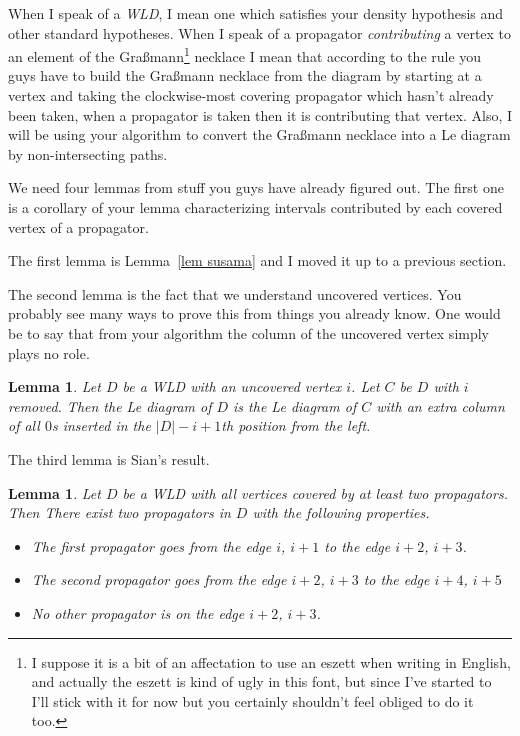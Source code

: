 \documentclass[11pt]{article}
\newtheorem{lem}[thm]{Lemma}
\theoremstyle{remark}
\theoremstyle{definition}
\begin{document}
When I speak of a \emph{WLD}, I mean one which satisfies your density hypothesis and other standard hypotheses.  When I speak of a propagator \emph{contributing} a vertex to an element of the Gra\ss mann\footnote{I suppose it is a bit of an affectation to use an eszett when writing in English, and actually the eszett is kind of ugly in this font, but since I've started to I'll stick with it for now but you certainly shouldn't feel obliged to do it too.} necklace I mean that according to the rule you guys have to build the Gra\ss mann necklace from the diagram by starting at a vertex and taking the clockwise-most covering propagator which hasn't already been taken, when a propagator is taken then it is contributing that vertex.  Also, I will be using your algorithm to convert the Gra\ss mann necklace into a Le diagram by non-intersecting paths.


We need four lemmas from stuff you guys have already figured out.  The first one is a corollary of your lemma characterizing intervals contributed by each covered vertex of a propagator.

The first lemma is Lemma~\ref{lem susama} and I moved it up to a previous section.

The second lemma is the fact that we understand uncovered vertices.  You probably see many ways to prove this from things you already know.  One would be to say that from your algorithm the column of the uncovered vertex simply plays no role.

\begin{lem}\label{lem uncovered}
  Let $D$ be a WLD with an uncovered vertex $i$.  Let $C$ be $D$ with $i$ removed.  Then the Le diagram of $D$ is the Le diagram of $C$ with an extra column of all $0$s inserted in the $|D|-i+1$th position from the left.
\end{lem}

The third lemma is Sian's result.

\begin{lem}\label{lem sian}
  Let $D$ be a WLD with all vertices covered by at least two propagators.  Then There exist two propagators in $D$ with the following properties.
  \begin{itemize}
  \item The first propagator goes from the edge $i$, $i+1$ to the edge $i+2$, $i+3$.
  \item The second propagator goes from the edge $i+2$, $i+3$ to the edge $i+4$, $i+5$
  \item No other propagator is on the edge $i+2$, $i+3$.
  \end{itemize}
\end{lem}
\end{document}
